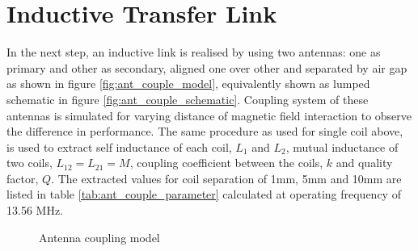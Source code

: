 \documentclass[12pt,a4paper,UKenglish]{report}
\begin{document}
\section{Inductive Transfer Link}		%

In the next step, an inductive link is realised by using two antennas: one as primary and other as secondary, aligned one over 
other and separated by air gap as shown in figure  \ref{fig:ant_couple_model}, equivalently shown as lumped schematic in 
figure  \ref{fig:ant_couple_schematic}. Coupling system of these antennas is simulated for 
varying distance of magnetic field interaction to observe the difference in performance. The same procedure as 
used for single coil above, is used to extract self inductance of each coil, $L_{1}$ and $L_{2}$, mutual inductance 
of two coils, $ L_{12} = L_{21} = M $, coupling coefficient between the coils, $k$ and quality factor, $Q$. The extracted values for coil separation of 
1mm, 5mm and 10mm are listed in table \ref{tab:ant_couple_parameter} calculated at operating frequency of 13.56 MHz. \\

\begin{figure} [htbp]
  \centering 
\hfill
 \caption{Antenna coupling model} 
\label{fig:ant_couple} 
\end{figure}
\end{document}
